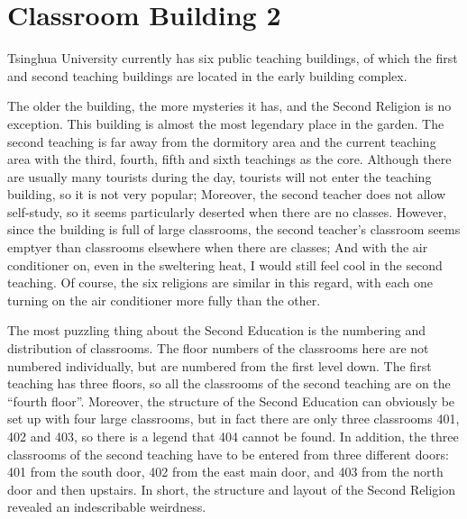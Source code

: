 \chapter{Classroom Building 2}

Tsinghua University currently has six public teaching buildings, of which the
first and second teaching buildings are located in the early building complex.

The older the building, the more mysteries it has, and the Second Religion is
no exception. This building is almost the most legendary place in the garden.
The second teaching is far away from the dormitory area and the current
teaching area with the third, fourth, fifth and sixth teachings as the core.
Although there are usually many tourists during the day, tourists will not
enter the teaching building, so it is not very popular; Moreover, the second
teacher does not allow self-study, so it seems particularly deserted when there
are no classes.  However, since the building is full of large classrooms, the
second teacher’s classroom seems emptyer than classrooms elsewhere when there
are classes; And with the air conditioner on, even in the sweltering heat, I
would still feel cool in the second teaching. Of course, the six religions are
similar in this regard, with each one turning on the air conditioner more fully
than the other.

The most puzzling thing about the Second Education is the numbering and
distribution of classrooms.  The floor numbers of the classrooms here are not
numbered individually, but are numbered from the first level down. The first
teaching has three floors, so all the classrooms of the second teaching are on
the “fourth floor”.  Moreover, the structure of the Second Education can
obviously be set up with four large classrooms, but in fact there are only
three classrooms 401, 402 and 403, so there is a legend that 404 cannot be
found.  In addition, the three classrooms of the second teaching have to be
entered from three different doors: 401 from the south door, 402 from the east
main door, and 403 from the north door and then upstairs.  In short, the
structure and layout of the Second Religion revealed an indescribable
weirdness.

